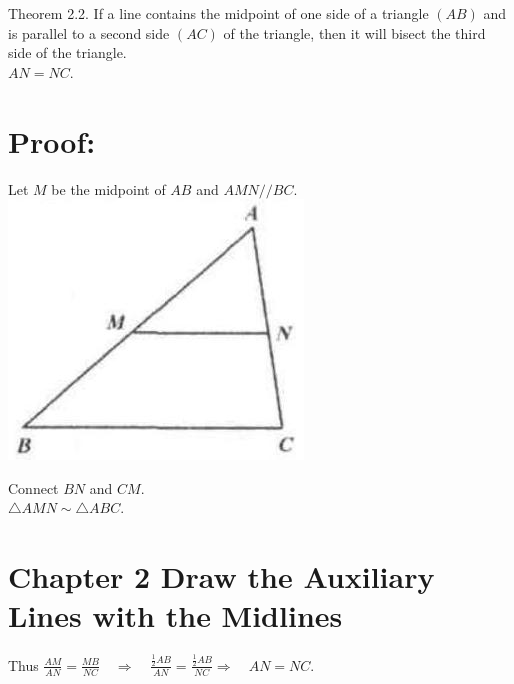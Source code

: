 \documentclass[10pt]{article}
\begin{document}
Theorem 2.2. If a line contains the midpoint of one side of a triangle \((A B)\) and is parallel to a second side \((A C)\) of the triangle, then it will bisect the third side of the triangle.\\
\(A N=N C\).

\section*{Proof:}
Let \(M\) be the midpoint of \(A B\) and \(A M N / / B C\).\\
\includegraphics[max width=\textwidth, center]{2025_04_17_97bc1f7e44d93c271a88g-033(1)}

Connect \(B N\) and \(C M\).\\
\(\triangle A M N \sim \triangle A B C\).

\section*{Chapter 2 Draw the Auxiliary Lines with the Midlines}
Thus \(\frac{A M}{A N}=\frac{M B}{N C} \quad \Rightarrow \quad \frac{\frac{1}{2} A B}{A N}=\frac{\frac{1}{2} A B}{N C} \Rightarrow \quad A N=N C\).
\end{document}
